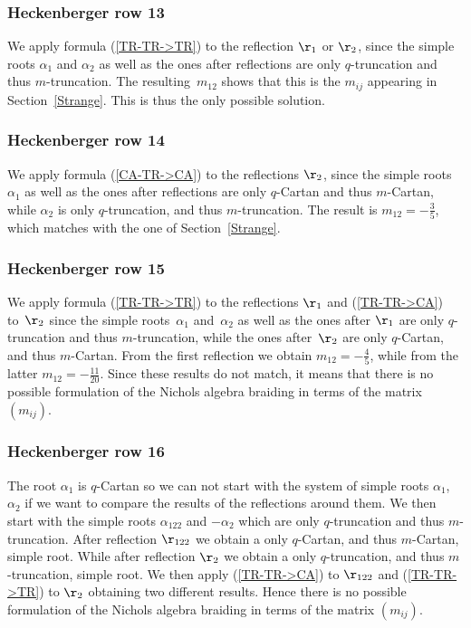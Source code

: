 \documentclass[10pt,a4paper]{amsart}
\numberwithin{equation}{section}
\begin{document}
\subsubsection*{Heckenberger row 13}
We apply formula (\ref{TR-TR->TR}) to the reflection $\r_1$ or $\r_2$, since the simple roots $\alpha_1$ and $\alpha_2$ as well as the ones after reflections are only $q$-truncation and thus $m$-truncation. The resulting~$m_{12}$ shows that this is the $m_{ij}$ appearing in Section~\ref{Strange}. This is thus the only possible solution.

\subsubsection*{Heckenberger row 14}
We apply formula (\ref{CA-TR->CA}) to the reflections $\r_2$, since the simple roots $\alpha_1$ as well as the ones after reflections are only $q$-Cartan and thus $m$-Cartan, while $\alpha_2$ is only $q$-truncation, and thus $m$-truncation. The result is $m_{12}=-\frac{3}{5}$, which matches with the one of Section~\ref{Strange}.

\subsubsection*{Heckenberger row 15}
We apply formula (\ref{TR-TR->TR}) to the reflections $\r_1$ and (\ref{TR-TR->CA}) to~$\r_2$ since the simple roots~$\alpha_1$ and~$\alpha_2$ as well as the ones after $\r_1$ are only $q$-truncation and thus $m$-truncation, while the ones after~$\r_2$ are only $q$-Cartan, and thus $m$-Cartan. From the first reflection we obtain $m_{12}=-\frac{4}{5}$, while from the latter $m_{12}=-\frac{11}{20}$. Since these results do not match, it means that there is no possible formulation of the Nichols algebra braiding in terms of the matrix~$(m_{ij})$.

\subsubsection*{Heckenberger row 16}
The root $\alpha_1$ is $q$-Cartan so we can not start with the system of simple roots $\alpha_1$, $\alpha_2$ if we want to compare the results of the reflections around them.
We then start with the simple roots $\alpha_{122}$ and $-\alpha_2$ which are only $q$-truncation and thus $m$-truncation.
After reflection $\r_{122}$ we obtain a only $q$-Cartan, and thus $m$-Cartan, simple root. While after reflection $\r_{2}$ we obtain a only $q$-truncation, and thus $m$-truncation, simple root. We then apply (\ref{TR-TR->CA}) to $\r_{122}$ and (\ref{TR-TR->TR}) to $\r_{2}$ obtaining two different results. Hence there is no possible formulation of the Nichols algebra braiding in terms of the matrix $(m_{ij})$.
\end{document}
